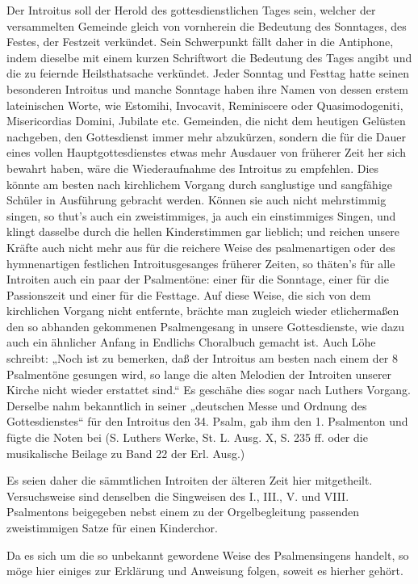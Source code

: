 Der Introitus soll der Herold des gottesdienstlichen Tages sein, welcher der versammelten Gemeinde gleich von vornherein die Bedeutung des Sonntages, des Festes, der Festzeit verkündet. Sein Schwerpunkt fällt daher in die Antiphone, indem dieselbe mit einem kurzen Schriftwort die Bedeutung des Tages angibt und die zu feiernde Heilsthatsache verkündet. Jeder Sonntag und Festtag hatte seinen besonderen Introitus und manche Sonntage haben ihre Namen von dessen erstem lateinischen Worte, wie Estomihi, Invocavit, Reminiscere oder Quasimodogeniti, Misericordias Domini, Jubilate etc. Gemeinden, die nicht dem heutigen Gelüsten nachgeben, den Gottesdienst immer mehr abzukürzen, sondern die für die
Dauer eines vollen Hauptgottesdienstes etwas mehr Ausdauer von früherer Zeit her sich bewahrt haben, wäre die Wiederaufnahme des Introitus zu empfehlen. Dies könnte am besten nach kirchlichem Vorgang durch sanglustige und sangfähige Schüler in Ausführung gebracht werden. Können sie auch nicht mehrstimmig singen, so thut’s auch ein zweistimmiges, ja auch ein einstimmiges Singen, und klingt dasselbe durch die hellen Kinderstimmen gar lieblich; und reichen unsere Kräfte auch nicht mehr aus für die reichere Weise des psalmenartigen oder des hymnenartigen festlichen Introitusgesanges früherer Zeiten, so thäten’s für alle Introiten auch ein paar der Psalmentöne: einer für die Sonntage, einer für die Passionszeit und einer für die Festtage. Auf diese Weise, die sich von dem kirchlichen Vorgang nicht entfernte, brächte man zugleich wieder etlichermaßen den so abhanden gekommenen Psalmengesang in unsere Gottesdienste, wie dazu auch ein ähnlicher Anfang in Endlichs Choralbuch gemacht ist. Auch Löhe schreibt: „Noch ist zu bemerken, daß der Introitus am besten nach einem der 8 Psalmentöne gesungen wird, so lange die alten Melodien der Introiten unserer Kirche nicht wieder erstattet sind.“ Es geschähe dies sogar nach Luthers Vorgang. Derselbe nahm bekanntlich in seiner „deutschen Messe und Ordnung des Gottesdienstes“ für den Introitus den 34. Psalm, gab ihm den 1. Psalmenton und fügte die Noten bei (S. Luthers Werke, St. L. Ausg. X, S. 235 ff. oder die musikalische Beilage zu Band 22 der Erl. Ausg.)

Es seien daher die sämmtlichen Introiten der älteren Zeit hier mitgetheilt. Versuchsweise sind denselben die Singweisen des I., III., V. und VIII. Psalmentons beigegeben nebst einem zu der Orgelbegleitung passenden zweistimmigen Satze für einen Kinderchor.

Da es sich um die so unbekannt gewordene Weise des Psalmensingens handelt, so möge hier einiges zur Erklärung und Anweisung folgen, soweit es hierher gehört.

